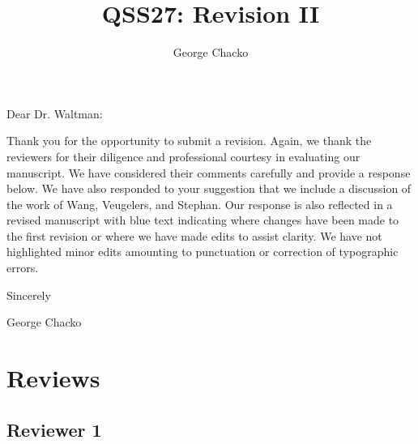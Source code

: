 \documentclass[11pt, oneside]{article}   	%
\title{QSS27: Revision II}
\author{George Chacko}
\begin{document}
\maketitle

Dear Dr. Waltman:

\vspace{5mm}
\raggedright 
Thank you for the opportunity to submit a revision. Again, we thank the reviewers for their diligence and professional courtesy in evaluating our manuscript. We have considered their comments carefully and provide a response below. We have also responded to your suggestion that we include a discussion of the work of Wang, Veugelers, and Stephan. Our response is also reflected in a revised manuscript with blue text indicating where changes have been made to the first revision or where we have made edits to assist clarity. We have not highlighted minor edits amounting to punctuation or correction of typographic errors. 

\vspace{3mm}
Sincerely
\vspace{5mm}

George Chacko

\section{Reviews}
\subsection{Reviewer 1}
\end{document}
